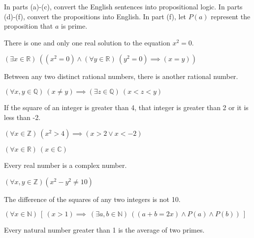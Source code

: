 \documentclass[11pt]{article}
\begin{document}
In parts (a)-(c), convert the English sentences into propositional logic. In parts (d)-(f), convert the propositions into English. In part (f), let $P(a)$ represent the proposition that $a$ is prime.
\begin{Parts}

\Part There is one and only one real solution to the equation $x^2 = 0$.
\\\begin{solution}
    $(\exists x \in \mathbb{R})\ ((x^2 = 0) \land (\forall y \in \mathbb{R})\ (y^2 = 0) \implies (x = y))$
\end{solution}
\Part Between any two distinct rational numbers, there is another rational number.
\\\begin{solution}
    $(\forall x,y \in \mathbb{Q})\ (x \not= y) \implies (\exists z \in \mathbb{Q})\ (x < z < y)$
\end{solution}
\Part If the square of an integer is greater than 4, that integer is greater than 2 or it is less than -2.
\\\begin{solution}
    $(\forall x \in \mathbb{Z})\ (x^2 > 4) \implies (x > 2 \lor x < -2)$
\end{solution}
\Part $(\forall x \in \mathbb{R})\ (x \in \mathbb{C})$
\\\begin{solution}
    Every real number is a complex number.
\end{solution}
\Part $(\forall x,y \in \mathbb{Z}) (x^2-y^2 \not=10)$
\\\begin{solution}
    The difference of the squares of any two integers is not 10.
\end{solution}
\Part $(\forall x \in \mathbb{N})\ \left[ \ (x > 1) \implies \ (\exists a, b \in \mathbb{N})  \ \left( (a + b = 2x)\land P(a) \land P(b) \right) \ \right]$
\\\begin{solution}
    Every natural number greater than 1 is the average of two primes.
\end{solution}
\end{Parts}
\end{document}
